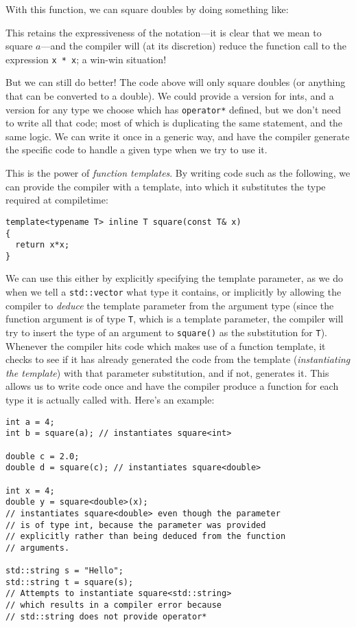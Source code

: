\documentclass[a4paper]{scrartcl}
\begin{document}


With this function, we can square doubles by doing something like:



This retains the expressiveness of the notation---it is clear that we mean to square $a$---and the compiler will (at its discretion) reduce the function call to the expression \verb|x * x|; a win-win situation!

But we can still do better! The code above will only square doubles (or anything that can be converted to a double). We could provide a version for ints, and a version for any type we choose which has \verb|operator*| defined, but we don't need to write all that code; most of which is duplicating the same statement, and the same logic. We can write it once in a generic way, and have the compiler generate the specific code to handle a given type when we try to use it.

This is the power of \emph{function templates}. By writing code such as the following, we can provide the compiler with a template, into which it substitutes the type required at compiletime:

\begin{verbatim}
template<typename T> inline T square(const T& x)
{
  return x*x;
}
\end{verbatim}

We can use this either by explicitly specifying the template parameter, as we do when we tell a \verb|std::vector| what type it contains, or implicitly by allowing the compiler to \emph{deduce} the template parameter from the argument type (since the function argument is of type \verb|T|, which is a template parameter, the compiler will try to insert the type of an argument to \verb|square()| as the substitution for \verb|T|). Whenever the compiler hits code which makes use of a function template, it checks to see if it has already generated the code from the template (\emph{instantiating the template}) with that parameter substitution, and if not, generates it. This allows us to write code once and have the compiler produce a function for each type it is actually called with. Here's an example:

\begin{verbatim}
int a = 4;
int b = square(a); // instantiates square<int>

double c = 2.0;
double d = square(c); // instantiates square<double>

int x = 4;
double y = square<double>(x);
// instantiates square<double> even though the parameter
// is of type int, because the parameter was provided
// explicitly rather than being deduced from the function
// arguments.

std::string s = "Hello";
std::string t = square(s);
// Attempts to instantiate square<std::string>
// which results in a compiler error because
// std::string does not provide operator*
\end{verbatim}
\end{document}
